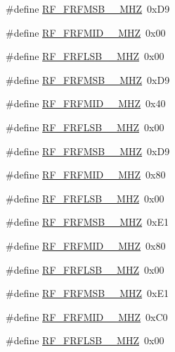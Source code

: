 \begin{DoxyCompactItemize}
\item 
\#define \hyperlink{sx1276Regs-Fsk_8h_a3d68b88442a5c8b7f80d9c615088220b}{R\+F\+\_\+\+F\+R\+F\+M\+S\+B\+\_\+\_\+\+M\+HZ}~0x\+D9
\item 
\#define \hyperlink{sx1276Regs-Fsk_8h_a2ba15a463e655bf6b331e41d1162abbc}{R\+F\+\_\+\+F\+R\+F\+M\+I\+D\+\_\+\_\+\+M\+HZ}~0x00
\item 
\#define \hyperlink{sx1276Regs-Fsk_8h_a9a969086561d3e987798039b3b9cac58}{R\+F\+\_\+\+F\+R\+F\+L\+S\+B\+\_\+\_\+\+M\+HZ}~0x00
\item 
\#define \hyperlink{sx1276Regs-Fsk_8h_ab854d00a5751351eb073ba41bd066d27}{R\+F\+\_\+\+F\+R\+F\+M\+S\+B\+\_\+\_\+\+M\+HZ}~0x\+D9
\item 
\#define \hyperlink{sx1276Regs-Fsk_8h_a337c9786171b07f0fa5f58d53ae10758}{R\+F\+\_\+\+F\+R\+F\+M\+I\+D\+\_\+\_\+\+M\+HZ}~0x40
\item 
\#define \hyperlink{sx1276Regs-Fsk_8h_a6925adb66395bd8bb21743caba42c9f9}{R\+F\+\_\+\+F\+R\+F\+L\+S\+B\+\_\+\_\+\+M\+HZ}~0x00
\item 
\#define \hyperlink{sx1276Regs-Fsk_8h_a2ace97f7a21f64054c6e3269922426a1}{R\+F\+\_\+\+F\+R\+F\+M\+S\+B\+\_\+\_\+\+M\+HZ}~0x\+D9
\item 
\#define \hyperlink{sx1276Regs-Fsk_8h_adbc52c9dc5896fe162b01114caba6fc5}{R\+F\+\_\+\+F\+R\+F\+M\+I\+D\+\_\+\_\+\+M\+HZ}~0x80
\item 
\#define \hyperlink{sx1276Regs-Fsk_8h_a6c0278026a620c9acd18814372785f46}{R\+F\+\_\+\+F\+R\+F\+L\+S\+B\+\_\+\_\+\+M\+HZ}~0x00
\item 
\#define \hyperlink{sx1276Regs-Fsk_8h_aede2d8353a6f4503837b467d42177217}{R\+F\+\_\+\+F\+R\+F\+M\+S\+B\+\_\+\_\+\+M\+HZ}~0x\+E1
\item 
\#define \hyperlink{sx1276Regs-Fsk_8h_a7f8d47495d559a0d89bee64f0f219578}{R\+F\+\_\+\+F\+R\+F\+M\+I\+D\+\_\+\_\+\+M\+HZ}~0x80
\item 
\#define \hyperlink{sx1276Regs-Fsk_8h_ac420052c647dbb18db24e44bd556dc45}{R\+F\+\_\+\+F\+R\+F\+L\+S\+B\+\_\+\_\+\+M\+HZ}~0x00
\item 
\#define \hyperlink{sx1276Regs-Fsk_8h_a20b708b5fdc452b10f5c014592235ed4}{R\+F\+\_\+\+F\+R\+F\+M\+S\+B\+\_\+\_\+\+M\+HZ}~0x\+E1
\item 
\#define \hyperlink{sx1276Regs-Fsk_8h_ad673e935e767a6107b7ed126f2b0e020}{R\+F\+\_\+\+F\+R\+F\+M\+I\+D\+\_\+\_\+\+M\+HZ}~0x\+C0
\item 
\#define \hyperlink{sx1276Regs-Fsk_8h_a9b654fee5670a21e74b9b3f2a71d1929}{R\+F\+\_\+\+F\+R\+F\+L\+S\+B\+\_\+\_\+\+M\+HZ}~0x00

\end{DoxyCompactItemize}
